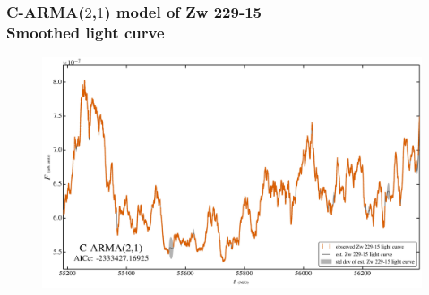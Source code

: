 \documentclass[hyperref={pdfpagelabels=false}]{beamer}
\begin{document}
\begin{frame}
\frametitle{C-ARMA($2$,$1$) model of Zw 229-15\\Smoothed light curve}
  \begin{figure}
    \includegraphics[scale=0.065]{images/Zw229-15_LC.jpg}
  \end{figure}
\end{frame}

\end{document}
